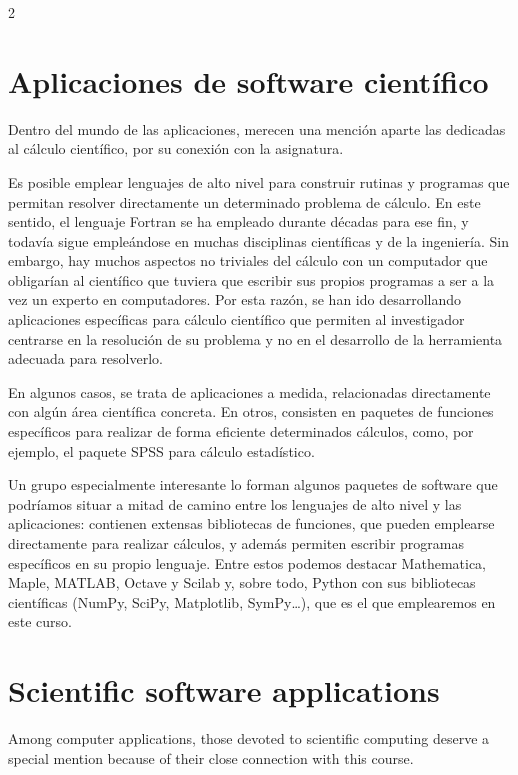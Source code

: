 \begin{paracol}{2}
 \section{Aplicaciones de software científico}
Dentro del mundo de las aplicaciones, merecen una mención aparte las dedicadas al cálculo científico, por su conexión con la asignatura.

Es posible emplear lenguajes de alto nivel para construir rutinas y programas que permitan resolver directamente un determinado problema de cálculo. En este sentido, el lenguaje Fortran se ha empleado durante décadas para ese fin, y todavía sigue empleándose en muchas disciplinas científicas y de la ingeniería. Sin embargo, hay muchos aspectos no triviales del cálculo con un computador que obligarían al científico que tuviera que escribir sus propios programas a ser a la vez un experto en computadores. Por esta razón, se han ido desarrollando aplicaciones específicas para cálculo científico que permiten al investigador centrarse en la resolución de su problema y no en el desarrollo de la herramienta adecuada para resolverlo.

En algunos casos, se trata de aplicaciones a medida, relacionadas directamente con algún área científica concreta. En otros, consisten en paquetes de funciones específicos para realizar de forma eficiente determinados cálculos, como, por ejemplo, el paquete SPSS para cálculo estadístico.

Un grupo especialmente interesante lo forman algunos paquetes de software que podríamos situar a mitad de camino entre los lenguajes de alto nivel y las aplicaciones: contienen extensas bibliotecas de funciones, que pueden emplearse directamente para realizar cálculos, y además permiten escribir programas específicos en su propio lenguaje. Entre estos podemos destacar Mathematica, Maple, MATLAB, Octave y Scilab y, sobre todo, Python con sus bibliotecas científicas (NumPy, SciPy, Matplotlib, SymPy\ldots), que es el que emplearemos en este curso.
\switchcolumn

\section{Scientific software applications}

Among computer applications, those devoted to scientific computing deserve a special mention because of their close connection with this course.


\end{paracol}
